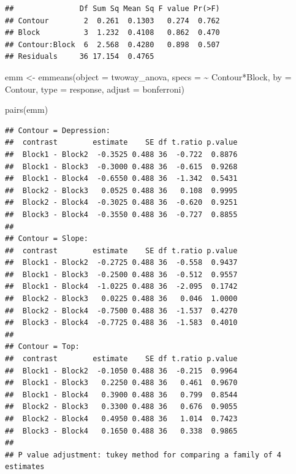 \documentclass[
]{book}
\newenvironment{Shaded}{\begin{snugshade}}{\end{snugshade}}
\newcommand{\AttributeTok}[1]{\textcolor[rgb]{0.77,0.63,0.00}{#1}}
\newcommand{\FunctionTok}[1]{\textcolor[rgb]{0.00,0.00,0.00}{#1}}
\newcommand{\NormalTok}[1]{#1}
\newcommand{\OtherTok}[1]{\textcolor[rgb]{0.56,0.35,0.01}{#1}}
\newcommand{\SpecialCharTok}[1]{\textcolor[rgb]{0.00,0.00,0.00}{#1}}
\newcommand{\StringTok}[1]{\textcolor[rgb]{0.31,0.60,0.02}{#1}}
\begin{document}
\begin{verbatim}
##               Df Sum Sq Mean Sq F value Pr(>F)
## Contour        2  0.261  0.1303   0.274  0.762
## Block          3  1.232  0.4108   0.862  0.470
## Contour:Block  6  2.568  0.4280   0.898  0.507
## Residuals     36 17.154  0.4765
\end{verbatim}

\begin{Shaded}
\begin{Highlighting}[]
\NormalTok{emm }\OtherTok{\textless{}{-}} \FunctionTok{emmeans}\NormalTok{(}\AttributeTok{object =}\NormalTok{ twoway\_anova,}
                     \AttributeTok{specs =} \SpecialCharTok{\textasciitilde{}}\NormalTok{ Contour}\SpecialCharTok{*}\NormalTok{Block,}
                     \AttributeTok{by =} \StringTok{\textquotesingle{}Contour\textquotesingle{}}\NormalTok{, }
                     \AttributeTok{type =} \StringTok{\textquotesingle{}response\textquotesingle{}}\NormalTok{,}
                     \AttributeTok{adjust =} \StringTok{\textquotesingle{}bonferroni\textquotesingle{}}\NormalTok{)}


\FunctionTok{pairs}\NormalTok{(emm)}
\end{Highlighting}
\end{Shaded}

\begin{verbatim}
## Contour = Depression:
##  contrast        estimate    SE df t.ratio p.value
##  Block1 - Block2  -0.3525 0.488 36  -0.722  0.8876
##  Block1 - Block3  -0.3000 0.488 36  -0.615  0.9268
##  Block1 - Block4  -0.6550 0.488 36  -1.342  0.5431
##  Block2 - Block3   0.0525 0.488 36   0.108  0.9995
##  Block2 - Block4  -0.3025 0.488 36  -0.620  0.9251
##  Block3 - Block4  -0.3550 0.488 36  -0.727  0.8855
## 
## Contour = Slope:
##  contrast        estimate    SE df t.ratio p.value
##  Block1 - Block2  -0.2725 0.488 36  -0.558  0.9437
##  Block1 - Block3  -0.2500 0.488 36  -0.512  0.9557
##  Block1 - Block4  -1.0225 0.488 36  -2.095  0.1742
##  Block2 - Block3   0.0225 0.488 36   0.046  1.0000
##  Block2 - Block4  -0.7500 0.488 36  -1.537  0.4270
##  Block3 - Block4  -0.7725 0.488 36  -1.583  0.4010
## 
## Contour = Top:
##  contrast        estimate    SE df t.ratio p.value
##  Block1 - Block2  -0.1050 0.488 36  -0.215  0.9964
##  Block1 - Block3   0.2250 0.488 36   0.461  0.9670
##  Block1 - Block4   0.3900 0.488 36   0.799  0.8544
##  Block2 - Block3   0.3300 0.488 36   0.676  0.9055
##  Block2 - Block4   0.4950 0.488 36   1.014  0.7423
##  Block3 - Block4   0.1650 0.488 36   0.338  0.9865
## 
## P value adjustment: tukey method for comparing a family of 4 estimates
\end{verbatim}
\end{document}
